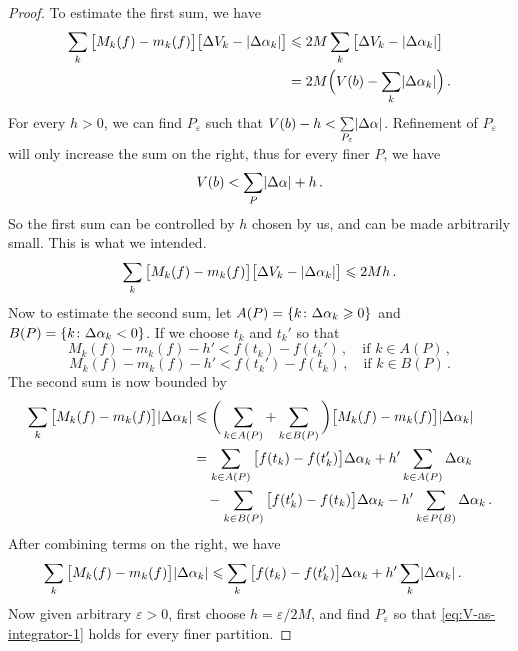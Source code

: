 \documentclass{article}
\DeclarePairedDelimiter\set{\lbrace}{\rbrace}
\DeclarePairedDelimiter\abs{\lvert}{\rvert}
\begin{document}
\begin{proof}
    To estimate the first sum, we have
    \begin{align*}
        \sum_k \big[ M_k(f) - m_k(f) \big] \big[ \Delta V_k - \abs{ \Delta \alpha_k } \big] &\leqslant 2 M \sum_k \big[ \Delta V_k - \abs{ \Delta \alpha_k } \big] \\
        &= 2 M \Big( V(b) - \sum_k \abs{ \Delta \alpha_k } \Big) \,.
    \end{align*}
    For every $ h > 0 $, we can find $ P_\varepsilon $ such that $ V(b) - h < \sum\limits_{P_\varepsilon} \abs{ \Delta \alpha } $. Refinement of $ P_\varepsilon $ will only increase the sum on the right, thus for every finer $ P $, we have
    \[ 
        V(b) < \sum_{P} \abs{ \Delta \alpha } + h \,.
    \]
    So the first sum can be controlled by $ h $ chosen by us, and can be made arbitrarily small. This is what we intended.
    \begin{align} \label{eq:V-as-integrator-1}
        \sum_k \big[ M_k(f) - m_k(f) \big] \big[ \Delta V_k - \abs{ \Delta \alpha_k } \big] \leqslant 2 M h \,.
    \end{align}
    Now to estimate the second sum, let $ A(P) = \set{k \colon \Delta \alpha_k \geqslant 0} $ and $ B(P) = \set{k \colon \Delta \alpha_k < 0} $. If we choose $ t_k $ and $ t_k' $ so that
    \[ 
        M_k(f) - m_k(f) - h' < f(t_k) - f(t_k') \,, \quad \text{if } k \in A(P) \,,
    \]
    \[ 
        M_k(f) - m_k(f) - h' < f(t_k') - f(t_k) \,, \quad \text{if } k \in B(P) \,.
    \]
    The second sum is now bounded by
    \begin{align*}
        \sum_k \big[ M_k(f) - m_k(f) \big] \abs{ \Delta \alpha_k } &\leqslant \bigg( \sum_{k \in A(P)} + \sum_{k \in B(P)} \bigg) \big[ M_k(f) - m_k(f) \big] \abs{ \Delta \alpha_k } \\
        &=  \sum_{k \in A(P)} \big[ f(t_k) - f(t_k') \big] \Delta \alpha_k + h' \sum_{k \in A(P)} \Delta \alpha_k \\
        &\quad - \sum_{k \in B(P)} \big[ f(t_k') - f(t_k) \big] \Delta \alpha_k - h' \sum_{k \in P(B)} \Delta \alpha_k \,.
    \end{align*}
    After combining terms on the right, we have
    \begin{align} \label{eq:V-as-integrator-2}
        \sum_k \big[ M_k(f) - m_k(f) \big] \abs{ \Delta \alpha_k } &\leqslant  \sum_{k} \big[ f(t_k) - f(t_k') \big] \Delta \alpha_k + h' \sum_k \abs{ \Delta \alpha_k } \,.
    \end{align}
    Now given arbitrary $ \varepsilon > 0 $, first choose $ h = \varepsilon / 2 M $, and find $ P_\varepsilon $ so that \eqref{eq:V-as-integrator-1} holds for every finer partition. 
    

\end{proof}
\end{document}
